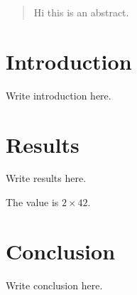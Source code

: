 \documentclass{article}
\begin{document}
\begin{abstract}
Hi this is an abstract.
\end{abstract}

\section{Introduction}

Write introduction here.

\section{Results}

Write results here.

The value is $2 \times 42$.

\section{Conclusion}

Write conclusion here.
\end{document}
